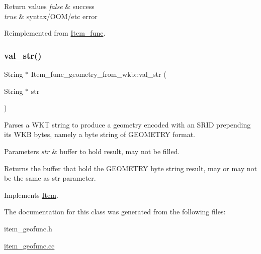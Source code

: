 \begin{DoxyRetVals}{Return values}
{\em false} & success \\
\hline
{\em true} & syntax/\+O\+O\+M/etc error \\
\hline
\end{DoxyRetVals}


Reimplemented from \mbox{\hyperlink{classItem__func_a6413cdbe7b14be77cc47462c9fc87ddb}{Item\+\_\+func}}.

\mbox{\label{classItem__func__geometry__from__wkb_ac1baee59e93751fb2b17f742bbcd183e}} 
\subsubsection{\texorpdfstring{val\+\_\+str()}{val\_str()}}
{\footnotesize\ttfamily String $\ast$ Item\+\_\+func\+\_\+geometry\+\_\+from\+\_\+wkb\+::val\+\_\+str (\begin{DoxyParamCaption}\item[{String $\ast$}]{str }\end{DoxyParamCaption})\hspace{0.3cm}{\ttfamily [virtual]}}

Parses a W\+KT string to produce a geometry encoded with an S\+R\+ID prepending its W\+KB bytes, namely a byte string of G\+E\+O\+M\+E\+T\+RY format. 
\begin{DoxyParams}{Parameters}
{\em str} & buffer to hold result, may not be filled. \\
\hline
\end{DoxyParams}
\begin{DoxyReturn}{Returns}
the buffer that hold the G\+E\+O\+M\+E\+T\+RY byte string result, may or may not be the same as \textquotesingle{}str\textquotesingle{} parameter. 
\end{DoxyReturn}


Implements \mbox{\hyperlink{classItem}{Item}}.



The documentation for this class was generated from the following files\+:\begin{DoxyCompactItemize}
\item 
item\+\_\+geofunc.\+h\item 
\mbox{\hyperlink{item__geofunc_8cc}{item\+\_\+geofunc.\+cc}}\end{DoxyCompactItemize}
